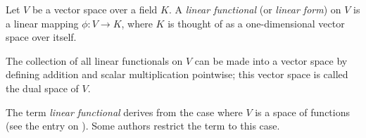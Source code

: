 \documentclass{article}
\begin{document}

Let $V$ be a vector space over a field $K$.
A \emph{linear functional} (or \emph{linear form}) on $V$
is a linear mapping $\phi\colon V\to K$,
where $K$ is thought of as a one-dimensional vector space over itself.

The collection of all linear functionals on $V$
can be made into a vector space
by defining addition and scalar multiplication pointwise;
this vector space is called the dual space of $V$.

The term {\it linear functional} derives from
the case where $V$ is a space of functions
(see the entry on ).
Some authors restrict the term to this case.
\end{document}
